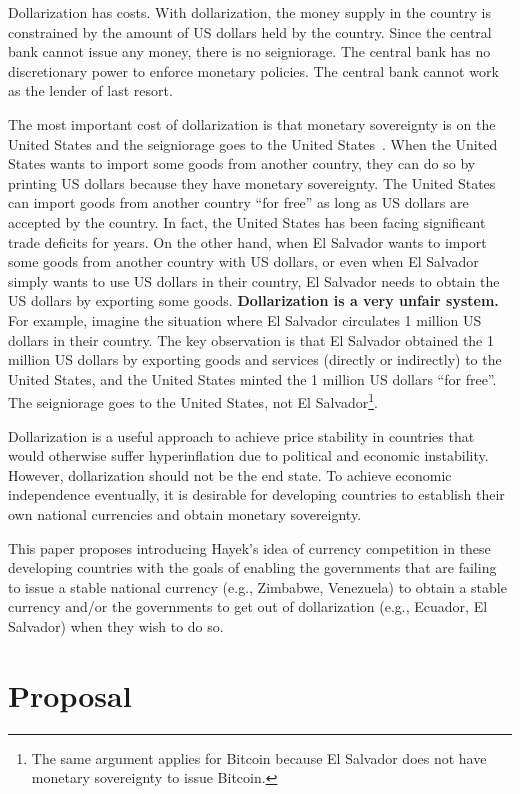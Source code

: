 \documentclass[dvipdfmx,a4paper]{article}
\begin{document}
Dollarization has costs. With dollarization, the money supply in the country is constrained by the amount of US dollars held by the country. Since the central bank cannot issue any money, there is no seigniorage. The central bank has no discretionary power to enforce monetary policies. The central bank cannot work as the lender of last resort.

The most important cost of dollarization is that monetary sovereignty is on the United States and the seigniorage goes to the United States~\cite{hara2021acb}. When the United States wants to import some goods from another country, they can do so by printing US dollars because they have monetary sovereignty. The United States can import goods from another country ``for free'' as long as US dollars are accepted by the country. In fact, the United States has been facing significant trade deficits for years. On the other hand, when El Salvador wants to import some goods from another country with US dollars, or even when El Salvador simply wants to use US dollars in their country, El Salvador needs to obtain the US dollars by exporting some goods. \textbf{Dollarization is a very unfair system.} For example, imagine the situation where El Salvador circulates 1 million US dollars in their country. The key observation is that El Salvador obtained the 1 million US dollars by exporting goods and services (directly or indirectly) to the United States, and the United States minted the 1 million US dollars ``for free''. The seigniorage goes to the United States, not El Salvador\footnote{The same argument applies for Bitcoin because El Salvador does not have monetary sovereignty to issue Bitcoin.}.

Dollarization is a useful approach to achieve price stability in countries that would otherwise suffer hyperinflation due to political and economic instability. However, dollarization should not be the end state. To achieve economic independence eventually, it is desirable for developing countries to establish their own national currencies and obtain monetary sovereignty.

This paper proposes introducing Hayek's idea of currency competition in these developing countries with the goals of enabling the governments that are failing to issue a stable national currency (e.g., Zimbabwe, Venezuela) to obtain a stable currency and/or the governments to get out of dollarization (e.g., Ecuador, El Salvador) when they wish to do so.

\section{Proposal}
\end{document}

